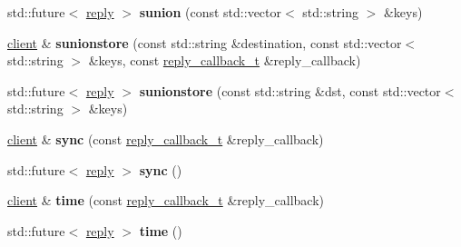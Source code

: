 \begin{DoxyCompactItemize}
\item 
\mbox{\label{classcpp__redis_1_1client_a7f76d091899206932d250edf3f990e94}} 
std\+::future$<$ \mbox{\hyperlink{classcpp__redis_1_1reply}{reply}} $>$ {\bfseries sunion} (const std\+::vector$<$ std\+::string $>$ \&keys)
\item 
\mbox{\label{classcpp__redis_1_1client_a26f38c6a8b7f03cd6ec9d5e4d121be32}} 
\mbox{\hyperlink{classcpp__redis_1_1client}{client}} \& {\bfseries sunionstore} (const std\+::string \&destination, const std\+::vector$<$ std\+::string $>$ \&keys, const \mbox{\hyperlink{classcpp__redis_1_1client_af7a65eb21aa25230bfbb0b0203c4fc04}{reply\+\_\+callback\+\_\+t}} \&reply\+\_\+callback)
\item 
\mbox{\label{classcpp__redis_1_1client_af71da68029a24b52a5005a24c859893d}} 
std\+::future$<$ \mbox{\hyperlink{classcpp__redis_1_1reply}{reply}} $>$ {\bfseries sunionstore} (const std\+::string \&dst, const std\+::vector$<$ std\+::string $>$ \&keys)
\item 
\mbox{\label{classcpp__redis_1_1client_a47d8402e7fa9f7b8a021356baf83fd1f}} 
\mbox{\hyperlink{classcpp__redis_1_1client}{client}} \& {\bfseries sync} (const \mbox{\hyperlink{classcpp__redis_1_1client_af7a65eb21aa25230bfbb0b0203c4fc04}{reply\+\_\+callback\+\_\+t}} \&reply\+\_\+callback)
\item 
\mbox{\label{classcpp__redis_1_1client_a09c4ffbad45c8ee8a171333ed81c8d43}} 
std\+::future$<$ \mbox{\hyperlink{classcpp__redis_1_1reply}{reply}} $>$ {\bfseries sync} ()
\item 
\mbox{\label{classcpp__redis_1_1client_aa98df57ae17365aaf0405b60f4711e92}} 
\mbox{\hyperlink{classcpp__redis_1_1client}{client}} \& {\bfseries time} (const \mbox{\hyperlink{classcpp__redis_1_1client_af7a65eb21aa25230bfbb0b0203c4fc04}{reply\+\_\+callback\+\_\+t}} \&reply\+\_\+callback)
\item 
\mbox{\label{classcpp__redis_1_1client_a7d0d5e0a02e97ad6d8733430489df321}} 
std\+::future$<$ \mbox{\hyperlink{classcpp__redis_1_1reply}{reply}} $>$ {\bfseries time} ()
\item 

\end{DoxyCompactItemize}
